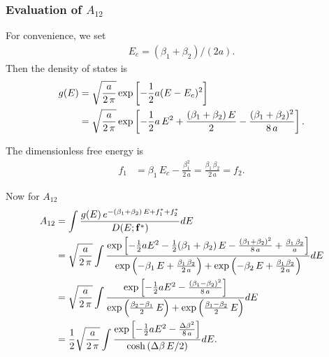\documentclass[aip,jcp,preprint,notitlepage, superscriptaddress]{revtex4-1}
\begin{document}
\subsubsection{Evaluation of $A_{12}$}



For convenience,
we set
\begin{align}
  E_c = (\beta_1 + \beta_2)/(2a).
  \label{eq:Ec_twoT}
\end{align}
%
Then the density of states is
%
\begin{align}
g(E)
&=
\sqrt{ \frac a { 2 \, \pi } }
\exp
\left[
  -\frac 1 2 a
  (E - E_c)^2
\right]
\notag \\
&=
\sqrt{ \frac a { 2 \, \pi } }
\exp
\left[
  -\frac 1 2 a \, E^2
  + \frac{
    (\beta_1 + \beta_2) \, E
  }{2}
  - \frac{
    (\beta_1 + \beta_2)^2
  }{ 8 \, a }
\right].
\end{align}


The dimensionless free energy is
%
\begin{align}
f_1
&=
\beta_1 \, E_c
- \frac{ \beta_1^2 } { 2 \, a }
=
\frac{\beta_1 \, \beta_2 } { 2 \, a }
= f_2.
\end{align}



Now for $A_{12}$
\begin{align}
A_{12}
&=
\int
\frac
{
  g(E) \, e^{ -(\beta_1 + \beta_2) \, E + f_1^* + f_2^*}
}
{
  D(E; \mathbf{f}^*)
}
dE
\notag \\
&=
\sqrt{ \frac a { 2 \, \pi } }
\int
\frac
{
  \exp\left[
    -\frac 1 2 a E^2
    - \frac 1 2 (\beta_1 + \beta_2) \, E
    - \frac{
      (\beta_1 + \beta_2)^2
    }{ 8 \, a }
    +
    \frac{ \beta_1 \, \beta_2 } { a }
  \right]
}
{
  \exp\left(
    -\beta_1 \, E
    + \frac{\beta_1 \, \beta_2}{2 \, a}
  \right)
  +
  \exp\left(
    -\beta_2 \, E
    + \frac{\beta_1 \, \beta_2}{2 \, a}
  \right)
}
dE
\notag \\
&=
\sqrt{ \frac a { 2 \, \pi } }
\int
\frac
{
  \exp\left[
    -\frac 1 2 a E^2
    - \frac{
      (\beta_1 - \beta_2)^2
    }{ 8 \, a }
  \right]
}
{
  \exp\left(
    \frac{ \beta_2 - \beta_1 } {2 } \, E
  \right)
  +
  \exp\left(
    \frac{ \beta_1 - \beta_2 } {2 } \, E
  \right)
}
dE
\notag \\
&=
\frac 1 2
\sqrt{ \frac a { 2 \, \pi } }
\int
\frac
{
  \exp\left[
    -\frac 1 2 a E^2
    - \frac{
      \Delta \beta^2
    }{ 8 \, a }
  \right]
}
{
  \cosh\left(
    \Delta \beta \, E / 2
  \right)
}
dE.
\label{eq:A12}
\end{align}
\end{document}
